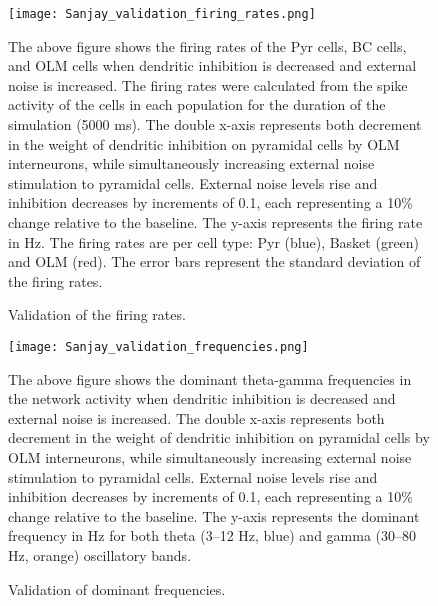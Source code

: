 \begin{figure}[htbp]
    \centering
    \texttt{[image: Sanjay\_validation\_firing\_rates.png]}
    \caption[Validation of the firing rates]{Validation of the firing rates.}\label{fig:validation_firing_rates}
    \begin{minipage}{0.9\textwidth}
        The above figure shows the firing rates of the Pyr cells, BC cells, and OLM cells when dendritic inhibition is decreased and external noise is increased.
        The firing rates were calculated from the spike activity of the cells in each population for the duration of the simulation (5000 ms).
        The double x-axis represents both decrement in the weight of dendritic inhibition on pyramidal cells by OLM interneurons,
        while simultaneously increasing external noise stimulation to pyramidal cells.
        External noise levels rise and inhibition decreases by increments of 0.1, each representing a 10\% change relative to the baseline.
        The y-axis represents the firing rate in Hz.
        The firing rates are per cell type: Pyr (blue), Basket (green) and OLM (red).
        The error bars represent the standard deviation of the firing rates.
    \end{minipage}
\end{figure}

\begin{figure}[htbp]
    \centering
    \texttt{[image: Sanjay\_validation\_frequencies.png]}
    \caption[Validation of the firing rates]{Validation of dominant frequencies.}\label{fig:validation_frequencies}
    \begin{minipage}{0.9\textwidth}
        The above figure shows the dominant theta-gamma frequencies in the network activity when dendritic inhibition is decreased and external noise is increased.
        The double x-axis represents both decrement in the weight of dendritic inhibition on pyramidal cells by OLM interneurons,
        while simultaneously increasing external noise stimulation to pyramidal cells.
        External noise levels rise and inhibition decreases by increments of 0.1, each representing a 10\% change relative to the baseline.
        The y-axis represents the dominant frequency in Hz for both theta (3--12 Hz, blue) and gamma (30--80 Hz, orange) oscillatory bands.
    \end{minipage}
\end{figure}

